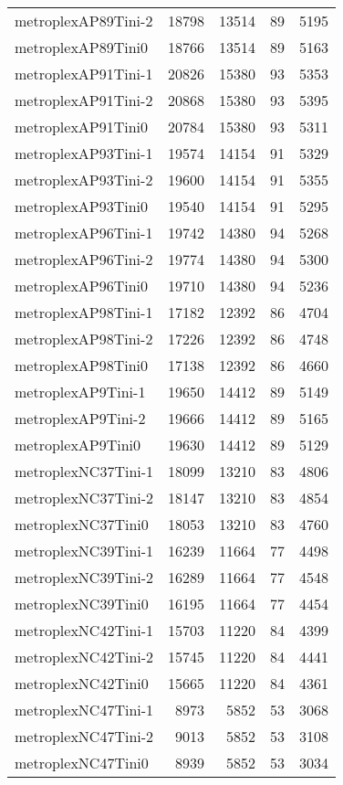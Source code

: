\begin{longtable}{lrrrr}
metroplexAP89Tini-2 & 18798 & 13514 & 89 & 5195 \\
metroplexAP89Tini0 & 18766 & 13514 & 89 & 5163 \\
metroplexAP91Tini-1 & 20826 & 15380 & 93 & 5353 \\
metroplexAP91Tini-2 & 20868 & 15380 & 93 & 5395 \\
metroplexAP91Tini0 & 20784 & 15380 & 93 & 5311 \\
metroplexAP93Tini-1 & 19574 & 14154 & 91 & 5329 \\
metroplexAP93Tini-2 & 19600 & 14154 & 91 & 5355 \\
metroplexAP93Tini0 & 19540 & 14154 & 91 & 5295 \\
metroplexAP96Tini-1 & 19742 & 14380 & 94 & 5268 \\
metroplexAP96Tini-2 & 19774 & 14380 & 94 & 5300 \\
metroplexAP96Tini0 & 19710 & 14380 & 94 & 5236 \\
metroplexAP98Tini-1 & 17182 & 12392 & 86 & 4704 \\
metroplexAP98Tini-2 & 17226 & 12392 & 86 & 4748 \\
metroplexAP98Tini0 & 17138 & 12392 & 86 & 4660 \\
metroplexAP9Tini-1 & 19650 & 14412 & 89 & 5149 \\
metroplexAP9Tini-2 & 19666 & 14412 & 89 & 5165 \\
metroplexAP9Tini0 & 19630 & 14412 & 89 & 5129 \\
metroplexNC37Tini-1 & 18099 & 13210 & 83 & 4806 \\
metroplexNC37Tini-2 & 18147 & 13210 & 83 & 4854 \\
metroplexNC37Tini0 & 18053 & 13210 & 83 & 4760 \\
metroplexNC39Tini-1 & 16239 & 11664 & 77 & 4498 \\
metroplexNC39Tini-2 & 16289 & 11664 & 77 & 4548 \\
metroplexNC39Tini0 & 16195 & 11664 & 77 & 4454 \\
metroplexNC42Tini-1 & 15703 & 11220 & 84 & 4399 \\
metroplexNC42Tini-2 & 15745 & 11220 & 84 & 4441 \\
metroplexNC42Tini0 & 15665 & 11220 & 84 & 4361 \\
metroplexNC47Tini-1 & 8973 & 5852 & 53 & 3068 \\
metroplexNC47Tini-2 & 9013 & 5852 & 53 & 3108 \\
metroplexNC47Tini0 & 8939 & 5852 & 53 & 3034 \\

\end{longtable}
